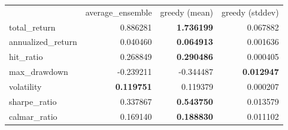\begin{tabular}{lrrr}
 & average_ensemble & greedy (mean) & greedy (stddev) \\
total_return & 0.886281 & \bfseries 1.736199 & 0.067882 \\
annualized_return & 0.040460 & \bfseries 0.064913 & 0.001636 \\
hit_ratio & 0.268849 & \bfseries 0.290486 & 0.000405 \\
max_drawdown & -0.239211 & -0.344487 & \bfseries 0.012947 \\
volatility & \bfseries 0.119751 & 0.119379 & 0.000207 \\
sharpe_ratio & 0.337867 & \bfseries 0.543750 & 0.013579 \\
calmar_ratio & 0.169140 & \bfseries 0.188830 & 0.011102 \\
\end{tabular}
